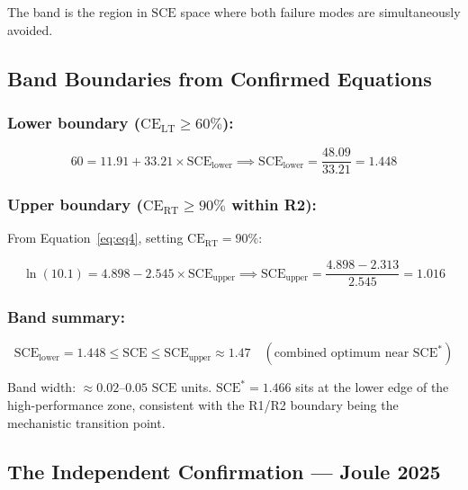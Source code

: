 \documentclass[12pt,letterpaper]{article}
\newcommand{\mSCE}{\mathrm{SCE}}
\newcommand{\mSCEstar}{\mathrm{SCE}^{*}}
\begin{document}
The band is the region in $\mSCE$ space where both
failure modes are simultaneously avoided.

\subsection{Band Boundaries from Confirmed Equations}
\label{sec:bounds}

\subsubsection*{Lower boundary
($\mathrm{CE}_{\mathrm{LT}} \geq 60\%$):}

\begin{equation}
  60 = 11.91 + 33.21 \times \mSCE_{\mathrm{lower}}
  \implies
  \mSCE_{\mathrm{lower}} = \frac{48.09}{33.21} = 1.448
  \label{eq:lower}
\end{equation}

\subsubsection*{Upper boundary
($\mathrm{CE}_{\mathrm{RT}} \geq 90\%$ within R2):}

From Equation~\ref{eq:eq4}, setting
$\mathrm{CE}_{\mathrm{RT}} = 90\%$:

\begin{equation}
  \ln(10.1) = 4.898 - 2.545 \times \mSCE_{\mathrm{upper}}
  \implies
  \mSCE_{\mathrm{upper}}
  = \frac{4.898 - 2.313}{2.545} = 1.016
  \label{eq:upper}
\end{equation}

\subsubsection*{Band summary:}

\begin{equation}
  \mSCE_{\mathrm{lower}} = 1.448
  \leq \mSCE \leq
  \mSCE_{\mathrm{upper}} \approx 1.47
  \quad
  (\text{combined optimum near } \mSCEstar)
  \label{eq:band}
\end{equation}

Band width: $\approx 0.02$--$0.05$ $\mSCE$ units.
$\mSCEstar = 1.466$ sits at the lower edge of the
high-performance zone, consistent with the R1/R2
boundary being the mechanistic transition point.

\subsection{The Independent Confirmation --- Joule 2025}
\label{sec:joule}
\end{document}
